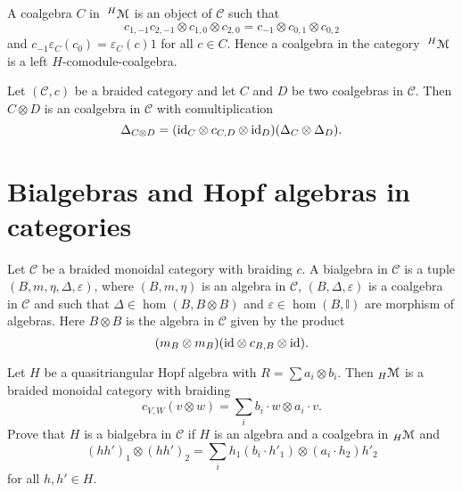 
\begin{example}
A coalgebra $C$ in $\;^{H}\mathcal{M}$ is an object of $\mathcal{C}$
such that 
\[
c_{1,-1}c_{2,-1}\otimes c_{1,0}\otimes c_{2,0}=c_{-1}\otimes c_{0,1}\otimes c_{0,2}
\]
and $c_{-1}\varepsilon_{C}(c_{0})=\varepsilon_{C}(c)1$ for all $c\in C$. Hence
a coalgebra in the category $\;^{H}\mathcal{M}$ is a left $H$-comodule-coalgebra.
\end{example}

\begin{example}
Let $(\mathcal{C},c)$ be a braided category and let $C$ and $D$ be two
coalgebras in $\mathcal{C}$. Then $C\otimes D$ is an coalgebra in $\mathcal{C}$
with comultiplication 
\[
\Delta_{C\otimes D}=(\mathrm{id}_C\otimes c_{C,D}\otimes \mathrm{id}_D)(\Delta_C\otimes\Delta_D).
\]
\end{example}

\section{Bialgebras and Hopf algebras in categories}

\begin{definition}
Let $\mathcal{C}$ be a braided monoidal category with braiding $c$.
A bialgebra in $\mathcal{C}$ is a tuple \textbf{$(B,m,\eta,\Delta,\varepsilon)$},
where $(B,m,\eta)$ is an algebra in $\mathcal{C}$, $(B,\Delta,\varepsilon)$
is a coalgebra in $\mathcal{C}$ and such that $\Delta\in\hom(B,B\otimes B)$
and $\varepsilon\in\hom(B,\mathbb{I})$ are morphism of algebras.
Here $B\otimes B$ is the algebra in $\mathcal{C}$ given by the product
\[
(m_{B}\otimes m_{B})(\mathrm{id}\otimes c_{B,B}\otimes\mathrm{id}).
\]
\end{definition}

\begin{exercise}
Let $H$ be a quasitriangular Hopf algebra with $R=\sum a_{i}\otimes b_{i}$.
Then ${}_{H}\mathcal{M}$ is a braided monoidal category with braiding
\[
c_{V,W}(v\otimes w)=\sum_{i}b_{i}\cdot w\otimes a_{i}\cdot v.
\]
Prove that $H$ is a bialgebra in $\mathcal{C}$ if $H$ is an algebra
and a coalgebra in ${}_{H}\mathcal{M}$ and 
\[
(hh')_{1}\otimes(hh')_{2}=\sum_{i}h_{1}(b_{i}\cdot h'_{1})\otimes(a_{i}\cdot h_{2})h'_{2}
\]
for all $h,h'\in H$.
\end{exercise}

